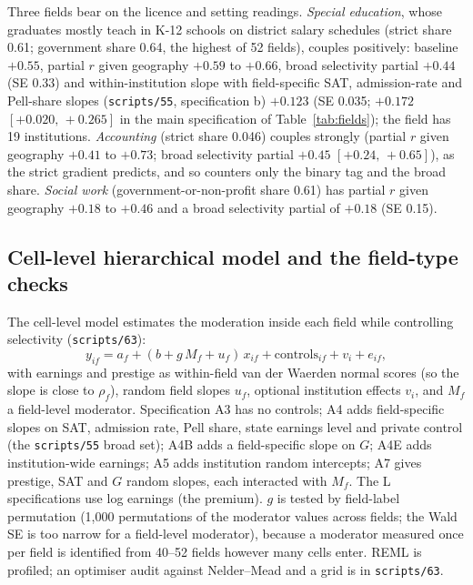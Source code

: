 \documentclass[11pt]{article}
\newcommand{\ci}[2]{$[#1,\allowbreak\,#2]$}
\newcommand{\scr}[1]{\texttt{scripts/#1}}
\begin{document}
Three fields bear on the licence and setting readings. \emph{Special education}, whose graduates mostly teach in K-12 schools
on district salary schedules (strict share 0.61; government share 0.64, the highest of 52 fields), couples positively:
baseline $+0.55$, partial $r$ given geography $+0.59$ to $+0.66$, broad selectivity partial $+0.44$ (SE 0.33) and
within-institution slope with field-specific SAT, admission-rate and Pell-share slopes (\scr{55}, specification b) $+0.123$ (SE 0.035; $+0.172$ \ci{+0.020}{+0.265} in the main specification of Table~\ref{tab:fields}); the field has 19 institutions. \emph{Accounting} (strict share 0.046) couples strongly
(partial $r$ given geography $+0.41$ to $+0.73$; broad selectivity partial $+0.45$ \ci{+0.24}{+0.65}), as the strict gradient
predicts, and so counters only the binary tag and the broad share. \emph{Social work} (government-or-non-profit share 0.61)
has partial $r$ given geography $+0.18$ to $+0.46$ and a broad selectivity partial of $+0.18$ (SE 0.15).

\subsection{Cell-level hierarchical model and the field-type checks}\label{sec:cellmodel}

The cell-level model estimates the moderation inside each field while controlling selectivity (\scr{63}):
\begin{equation}
y_{if}=a_f+(b+g\,M_f+u_f)\,x_{if}+\text{controls}_{if}+v_i+e_{if},\label{eq:cell}
\end{equation}
with earnings and prestige as within-field van der Waerden normal scores (so the slope is close to $\rho_f$), random
field slopes $u_f$, optional institution effects $v_i$, and $M_f$ a field-level moderator. Specification A3 has no
controls; A4 adds field-specific slopes on SAT, admission rate, Pell share, state earnings level and private control
(the \scr{55} broad set); A4B adds a field-specific slope on $G$; A4E adds institution-wide earnings; A5 adds institution
random intercepts; A7 gives prestige, SAT and $G$ random slopes, each interacted with $M_f$. The L specifications use log
earnings (the premium). $g$ is tested by field-label permutation (1,000 permutations of the moderator values across
fields; the Wald SE is too narrow for a field-level moderator), because a moderator measured once per field is identified
from 40--52 fields however many cells enter. REML is profiled; an optimiser audit against Nelder--Mead and a grid is in
\scr{63}.
\end{document}
